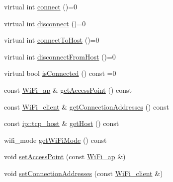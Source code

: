 \begin{DoxyCompactItemize}
\item 
virtual int \mbox{\hyperlink{classathome_1_1communication_1_1wifi_1_1_a_wi_fi_communicator_a309927109fbc19aa0fb2afb71d50bbf9}{connect}} ()=0
\item 
virtual int \mbox{\hyperlink{classathome_1_1communication_1_1wifi_1_1_a_wi_fi_communicator_a6131240ac0daa0f9fb4d46871feea4c2}{disconnect}} ()=0
\item 
virtual int \mbox{\hyperlink{classathome_1_1communication_1_1wifi_1_1_a_wi_fi_communicator_ac81395d55c9a6824136d7b63fdb096f0}{connect\+To\+Host}} ()=0
\item 
virtual int \mbox{\hyperlink{classathome_1_1communication_1_1wifi_1_1_a_wi_fi_communicator_aebcf385c3e0382eda7c99760f100901c}{disconnect\+From\+Host}} ()=0
\item 
virtual bool \mbox{\hyperlink{classathome_1_1communication_1_1wifi_1_1_a_wi_fi_communicator_a578087d01c814481d89ea702a6d7ed01}{is\+Connected}} () const =0
\item 
const \mbox{\hyperlink{structathome_1_1communication_1_1wifi_1_1s__wifi__access__point}{Wi\+Fi\+\_\+ap}} \& \mbox{\hyperlink{classathome_1_1communication_1_1wifi_1_1_a_wi_fi_communicator_abef86486512e4a39d61df3b27effcc87}{get\+Access\+Point}} () const
\item 
const \mbox{\hyperlink{structathome_1_1communication_1_1wifi_1_1s__wifi__client}{Wi\+Fi\+\_\+client}} \& \mbox{\hyperlink{classathome_1_1communication_1_1wifi_1_1_a_wi_fi_communicator_afcc41f462a12c8348148c915dcafd1a0}{get\+Connection\+Addresses}} () const
\item 
const \mbox{\hyperlink{structathome_1_1communication_1_1ip_1_1s__host}{ip\+::tcp\+\_\+host}} \& \mbox{\hyperlink{classathome_1_1communication_1_1wifi_1_1_a_wi_fi_communicator_a50dcf049687aa26a992b161f540b40f3}{get\+Host}} () const
\item 
wifi\+\_\+mode \mbox{\hyperlink{classathome_1_1communication_1_1wifi_1_1_a_wi_fi_communicator_adebc335ea6408a90919f396f06260b13}{get\+Wi\+Fi\+Mode}} () const
\item 
void \mbox{\hyperlink{classathome_1_1communication_1_1wifi_1_1_a_wi_fi_communicator_a2b802d934022436e029fc31b3e84d321}{set\+Access\+Point}} (const \mbox{\hyperlink{structathome_1_1communication_1_1wifi_1_1s__wifi__access__point}{Wi\+Fi\+\_\+ap}} \&)
\item 
void \mbox{\hyperlink{classathome_1_1communication_1_1wifi_1_1_a_wi_fi_communicator_a31fb91672f298718d99bb9776dfe46c9}{set\+Connection\+Addresses}} (const \mbox{\hyperlink{structathome_1_1communication_1_1wifi_1_1s__wifi__client}{Wi\+Fi\+\_\+client}} \&)

\end{DoxyCompactItemize}
